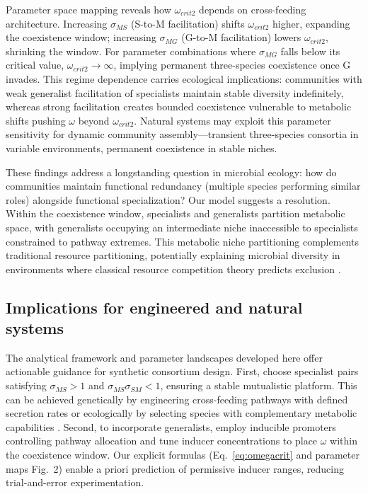 \documentclass[9pt,twocolumn]{pnas-new}
\begin{document}
Parameter space mapping reveals how $\omega_{crit2}$ depends on cross-feeding architecture. Increasing $\sigma_{MS}$ (S-to-M facilitation) shifts $\omega_{crit2}$ higher, expanding the coexistence window; increasing $\sigma_{MG}$ (G-to-M facilitation) lowers $\omega_{crit2}$, shrinking the window. For parameter combinations where $\sigma_{MG}$ falls below its critical value, $\omega_{crit2} \to \infty$, implying permanent three-species coexistence once G invades. This regime dependence carries ecological implications: communities with weak generalist facilitation of specialists maintain stable diversity indefinitely, whereas strong facilitation creates bounded coexistence vulnerable to metabolic shifts pushing $\omega$ beyond $\omega_{crit2}$. Natural systems may exploit this parameter sensitivity for dynamic community assembly—transient three-species consortia in variable environments, permanent coexistence in stable niches.

These findings address a longstanding question in microbial ecology: how do communities maintain functional redundancy (multiple species performing similar roles) alongside functional specialization? Our model suggests a resolution. Within the coexistence window, specialists and generalists partition metabolic space, with generalists occupying an intermediate niche inaccessible to specialists constrained to pathway extremes. This metabolic niche partitioning complements traditional resource partitioning, potentially explaining microbial diversity in environments where classical resource competition theory predicts exclusion \cite{wilson1999there,scheffer2018towards}.

\subsection*{Implications for engineered and natural systems}

The analytical framework and parameter landscapes developed here offer actionable guidance for synthetic consortium design. First, choose specialist pairs satisfying $\sigma_{MS} > 1$ and $\sigma_{MS}\sigma_{SM} < 1$, ensuring a stable mutualistic platform. This can be achieved genetically by engineering cross-feeding pathways with defined secretion rates \cite{mee2014syntrophic,harcombe2014metabolic} or ecologically by selecting species with complementary metabolic capabilities \cite{ziesack2019engineered}. Second, to incorporate generalists, employ inducible promoters controlling pathway allocation and tune inducer concentrations to place $\omega$ within the coexistence window. Our explicit formulas (Eq.~\ref{eq:omegacrit} and parameter maps Fig.~2) enable a priori prediction of permissive inducer ranges, reducing trial-and-error experimentation.
\end{document}

